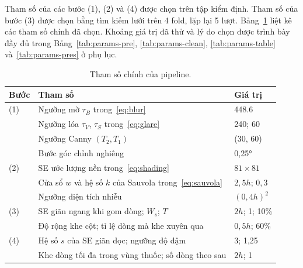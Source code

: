 Tham số của các bước (1), (2) và (4) được chọn trên tập kiểm định.
Tham số của bước (3) được chọn bằng tìm kiếm lưới trên 4 fold, lặp lại 5 lượt.
Bảng~\ref{tab:params-main} liệt kê các tham số chính đã chọn.
Khoảng giá trị đã thử và lý do chọn được trình bày đầy đủ trong Bảng~\ref{tab:params-pre}, \ref{tab:params-clean}, \ref{tab:params-table} và~\ref{tab:params-pres} ở phụ lục.

\begin{table}[H]
\centering
\caption{Tham số chính của pipeline.}\label{tab:params-main}
\small
\begin{tabularx}{\linewidth}{lXl}
\toprule
\textbf{Bước} & \textbf{Tham số} & \textbf{Giá trị} \\
\midrule
(1) & Ngưỡng mờ $\tau_B$ trong~\eqref{eq:blur} & \num{448.6} \\
    & Ngưỡng lóa $\tau_V$, $\tau_S$ trong~\eqref{eq:glare} & 240; 60 \\
    & Ngưỡng Canny $(T_2,T_1)$ & (30, 60) \\
    & Bước góc chỉnh nghiêng & 0,25° \\
(2) & SE ước lượng nền trong~\eqref{eq:shading} & $81\times81$ \\
    & Cửa sổ $w$ và hệ số $k$ của Sauvola trong~\eqref{eq:sauvola} & $2{,}5h$; $0{,}3$ \\
    & Ngưỡng diện tích nhiễu & $(0{,}4h)^2$ \\
(3) & SE giãn ngang khi gom dòng; $W_s$; $T$ & $2h$; 1; 10\% \\
    & Độ rộng khe cột; tỉ lệ dòng mà khe xuyên qua & $0{,}5h$; 60\% \\
(4) & Hệ số $s$ của SE giãn dọc; ngưỡng độ đậm & 3; 1,25 \\
    & Khe dòng tối đa trong vùng thuốc; số dòng theo sau & $2h$; 1 \\
\bottomrule
\end{tabularx}
\end{table}
